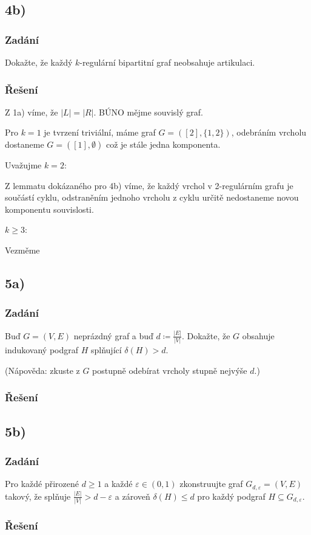 \documentclass[../main.tex]{subfiles}
\begin{document}
\subsection{4b)}
\subsubsection*{Zadání}
Dokažte, že každý $k$-regulární bipartitní graf neobsahuje artikulaci.

\subsubsection*{Řešení}

Z 1a) víme, že  $|L|=|R|$. BÚNO mějme souvislý graf. 

Pro $k=1$ je tvrzení triviální, máme graf $G=([2], \{1,2\})$, odebráním vrcholu dostaneme $G=([1], \emptyset)$ což je stále jedna komponenta.

Uvažujme $k=2$: 

Z lemmatu dokázaného pro 4b) víme, že každý vrchol v 2-regulárním grafu je součástí cyklu, 
odstraněním jednoho vrcholu z cyklu určitě nedostaneme novou komponentu souvislosti.

$k\geq 3$:

Vezměme 




\subsection{5a)}
\subsubsection*{Zadání}
Buď $G=(V,E)$ neprázdný graf a buď $d \coloneq \frac{|E|}{|V|}$. Dokažte, že $G$ obsahuje indukovaný podgraf $H$ splňující $\delta(H) > d$.

(Nápověda: zkuste z $G$ postupně odebírat vrcholy stupně nejvýše $d$.)

\subsubsection*{Řešení}


\subsection{5b)}
\subsubsection*{Zadání}
Pro každé přirozené $d\geq 1$ a každé $\varepsilon\in(0,1)$ zkonstruujte graf $G_{d,\varepsilon}= (V,E)$
takový, že splňuje $\frac{|E|}{|V|} > d - \varepsilon$ a zároveň $\delta(H)\leq d$ pro každý podgraf $H \subseteq G_{d,\varepsilon}$.


\subsubsection*{Řešení}
\end{document}
